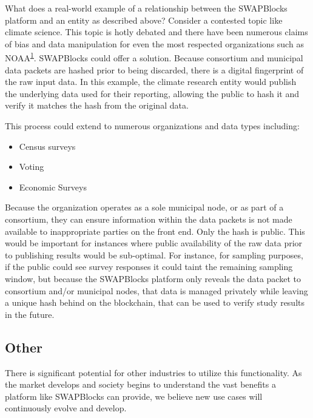\documentclass[12pt]{article}
\begin{document}
What does a real-world example of a relationship between the SWAPBlocks platform and an entity as described above? 
Consider a contested topic like climate science. This topic is hotly debated and there have been numerous claims of bias 
and data manipulation for even the most respected organizations such as 
NOAA\textsuperscript{\href{https://science.house.gov/news/press-releases/former-noaa-scientist-confirms-colleagues-manipulated-climate-records}{1}}. 
SWAPBlocks could offer a solution. Because consortium 
and municipal data packets are hashed prior to being discarded, there is a digital fingerprint of the raw input data. In this example, 
the climate research entity would publish the underlying data used for their reporting, allowing the public to hash it and verify it 
matches the hash from the original data.

This process could extend to numerous organizations and data types including:

\begin{itemize}
	\item{Census surveys}
	\item{Voting}
	\item{Economic Surveys}
\end{itemize}

Because the organization operates as a sole municipal node, or as part of a consortium, they can ensure information within 
the data packets is not made available to inappropriate parties on the front end. Only the hash is public. This would be 
important for instances where public availability of the raw data prior to publishing results would be sub-optimal. For instance, 
for sampling purposes, if the public could see survey responses it could taint the remaining sampling window, but because the SWAPBlocks 
platform only reveals the data packet to consortium and/or municipal nodes, that data is managed privately while leaving 
a unique hash behind on the blockchain, that can be used to verify study results in the future. 

\subsection{Other}

There is significant potential for other industries to utilize this functionality. As the market develops and society begins to understand the vast benefits a platform like SWAPBlocks can provide, we believe new use cases will continuously evolve and develop.
\end{document}
